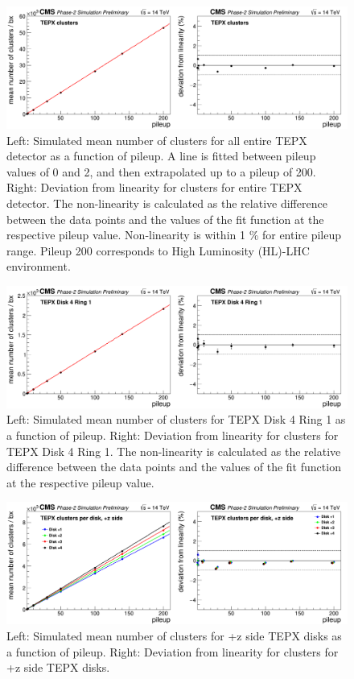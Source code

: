 \begin{figure}[H]
  \centering
  \includegraphics[width=1\columnwidth]{./totalclusters.png}
  \caption{\onehalfspacing Left: Simulated mean number of clusters for all entire TEPX detector as a function of pileup. A line is fitted between pileup values of 0 and 2, and then extrapolated up to a pileup of 200. Right: Deviation from linearity for clusters for entire TEPX detector. The non-linearity is calculated as the relative difference between the data points and the values of the fit function at the respective pileup value. Non-linearity is within 1 \% for entire pileup range. Pileup 200 corresponds to High Luminosity (HL)-LHC environment.}
  \label{fig:CMS}
\end{figure}



\begin{figure}[H]
  \centering
  \includegraphics[width=1\columnwidth]{./clustersD4R1.png}
  \caption{\onehalfspacing Left: Simulated mean number of clusters for TEPX Disk 4 Ring 1 as a function of pileup. Right: Deviation from linearity for clusters for TEPX Disk 4 Ring 1. The non-linearity is calculated as the relative difference between the data points and the values of the fit function at the respective pileup value.}
  \label{fig:CMS}
\end{figure}



\begin{figure}[H]
  \centering
  \includegraphics[width=1 \columnwidth]{./clustersperdisk+z.png}
  \caption{Left: Simulated mean number of clusters for +z side TEPX disks as a function of pileup. Right: Deviation from linearity for clusters for +z side TEPX disks.}
  \label{fig:CMS}
\end{figure}




